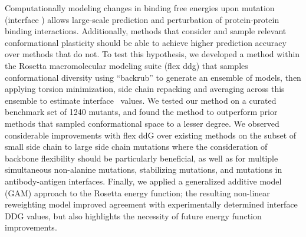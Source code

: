 Computationally modeling changes in binding free energies upon mutation (interface \ddg) allows large-scale prediction and perturbation of protein-protein binding interactions.
Additionally, methods that consider and sample relevant conformational plasticity should be able to achieve higher prediction accuracy over methods that do not.
To test this hypothesis, we developed a method within the Rosetta macromolecular modeling suite (flex ddg) that samples conformational diversity using ``backrub'' to generate an ensemble of models, then applying torsion minimization, side chain repacking and averaging across this ensemble to estimate interface \ddg\ values.
We tested our method on a curated benchmark set of 1240 mutants, and found the method to outperform prior methods that sampled conformational space to a lesser degree.
We observed considerable improvements with flex ddG over existing methods on the subset of small side chain to large side chain mutations where the consideration of backbone flexibility should be particularly beneficial, as well as for multiple simultaneous non-alanine mutations, stabilizing mutations, and mutations in antibody-antigen interfaces.
Finally, we applied a generalized additive model (GAM) approach to the Rosetta energy function; the resulting non-linear reweighting model improved agreement with experimentally determined interface DDG values, but also highlights the necessity of future energy function improvements.